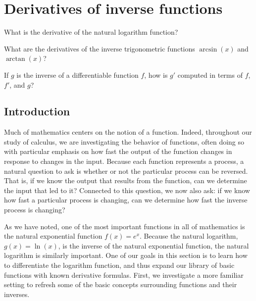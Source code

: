 \section{Derivatives of inverse functions} \label{S:2.8.Inverse}

\begin{goals}
\item What is the derivative of the natural logarithm function?
\item What are the derivatives of the inverse trigonometric functions $\arcsin(x)$ and $\arctan(x)$?
\item If $g$ is the inverse of a differentiable function $f$, how is $g'$ computed in terms of $f$, $f'$, and $g$?
\end{goals}

\subsection*{Introduction}

Much of mathematics centers on the notion of a function.  Indeed, throughout our study of calculus, we are investigating the behavior of functions, often doing so with particular emphasis on how fast the output of the function changes in response to changes in the input.  Because each function represents a process, a natural question to ask is whether or not the particular process can be reversed.  That is, if we know the output that results from the function, can we determine the input that led to it?  Connected to this question, we now also ask: if we know how fast a particular process is changing, can we determine how fast the inverse process is changing?

As we have noted, one of the most important functions in all of mathematics is the natural exponential function $f(x) = e^x$.  Because the natural logarithm, $g(x) = \ln(x)$, is the inverse of the natural exponential function, the natural logarithm is similarly important.  One of our goals in this section is to learn how to differentiate the logarithm function, and thus expand our library of basic functions with known derivative formulas.  First, we investigate a more familiar setting to refresh some of the basic concepts surrounding functions and their inverses.


